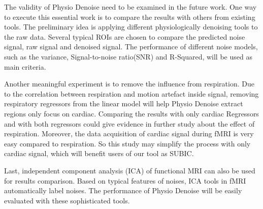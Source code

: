 The validity of Physio Denoise need to be examined in the future work.
One way to execute this essential work is to compare the results with others from existing tools.
The preliminary idea is applying different physiologically denoising tools to the raw data.
Several typical ROIs are chosen to compare the predicted noise signal, raw signal and denoised signal.
The performance of different noise models, such as
the variance, Signal-to-noise ratio(SNR) and R-Squared, will be used as main criteria.

Another meaningful experiment is to remove the influence from respiration. 
Due to the correlation between respiration and motion artefact inside signal, removing respiratory regressors from the 
linear model will help Physio Denoise extract regions only focus on cardiac. Comparing the results with only cardiac Regressors
and with both regressors could give evidence in further study about the effect of respiration. 
Moreover, the data acquisition of cardiac signal during fMRI is very easy compared to respiration.
So this study may simplify the process with only cardiac signal, which will benefit users of our tool as SUBIC.

Last, independent component analysis (ICA) of functional MRI can also be used for results comparison.
Based on typical features of noises, ICA tools in fMRI automatically label noises. The performance of Physio Denoise will be 
easily evaluated with these sophisticated tools.